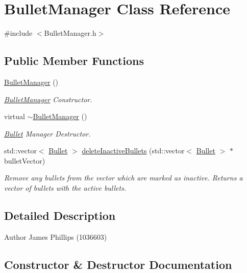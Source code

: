 \hypertarget{class_bullet_manager}{}\section{Bullet\+Manager Class Reference}
\label{class_bullet_manager}


{\ttfamily \#include $<$Bullet\+Manager.\+h$>$}

\subsection*{Public Member Functions}
\begin{DoxyCompactItemize}
\item 
\hyperlink{class_bullet_manager_a4aae3d492898b93dd5730dc28f2cc910}{Bullet\+Manager} ()
\begin{DoxyCompactList}\small\item\em \hyperlink{class_bullet_manager}{Bullet\+Manager} Constructor. \end{DoxyCompactList}\item 
virtual \hyperlink{class_bullet_manager_ae91d473833a2b3cc9bfb6180d3eb0099}{$\sim$\+Bullet\+Manager} ()
\begin{DoxyCompactList}\small\item\em \hyperlink{class_bullet}{Bullet} Manager Destructor. \end{DoxyCompactList}\item 
std\+::vector$<$ \hyperlink{class_bullet}{Bullet} $>$ \hyperlink{class_bullet_manager_a834ec287e01fc2ed7c5d3885e4b380c6}{delete\+Inactive\+Bullets} (std\+::vector$<$ \hyperlink{class_bullet}{Bullet} $>$ $\ast$bullet\+Vector)
\begin{DoxyCompactList}\small\item\em Remove any bullets from the vector which are marked as inactive. Returns a vector of bullets with the active bullets. \end{DoxyCompactList}\end{DoxyCompactItemize}


\subsection{Detailed Description}
\begin{DoxyAuthor}{Author}
James Phillips (1036603) 
\end{DoxyAuthor}


\subsection{Constructor \& Destructor Documentation}
\mbox{\label{class_bullet_manager_a4aae3d492898b93dd5730dc28f2cc910}} 
